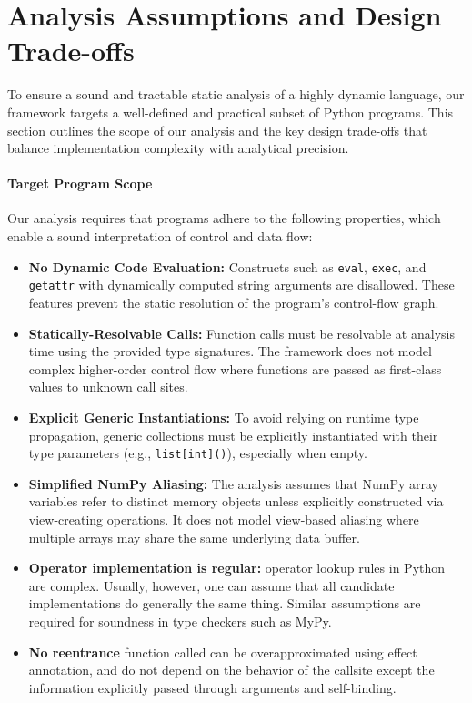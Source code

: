 \appendix
\section{Analysis Assumptions and Design Trade-offs}
\label{sec:appendix-assumptions}

To ensure a sound and tractable static analysis of a highly dynamic language, our framework targets a well-defined and practical subset of Python programs. This section outlines the scope of our analysis and the key design trade-offs that balance implementation complexity with analytical precision.

\paragraph{Target Program Scope}
Our analysis requires that programs adhere to the following properties, which enable a sound interpretation of control and data flow:
\begin{itemize}
    \item \textbf{No Dynamic Code Evaluation:} Constructs such as \texttt{eval}, \texttt{exec}, and \texttt{getattr} with dynamically computed string arguments are disallowed. These features prevent the static resolution of the program's control-flow graph.
    \item \textbf{Statically-Resolvable Calls:} Function calls must be resolvable at analysis time using the provided type signatures. The framework does not model complex higher-order control flow where functions are passed as first-class values to unknown call sites.
    \item \textbf{Explicit Generic Instantiations:} To avoid relying on runtime type propagation, generic collections must be explicitly instantiated with their type parameters (e.g., \texttt{list[int]()}), especially when empty.
    \item \textbf{Simplified NumPy Aliasing:} The analysis assumes that NumPy array variables refer to distinct memory objects unless explicitly constructed via view-creating operations. It does not model view-based aliasing where multiple arrays may share the same underlying data buffer.
    \item \textbf{Operator implementation is regular:} operator lookup rules in Python are complex. Usually, however, one can assume that all candidate implementations do generally the same thing. Similar assumptions are required for soundness in type checkers such as MyPy.
    \item \textbf{No reentrance} function called can be overapproximated using effect annotation, and do not depend on the behavior of the callsite except the information explicitly passed through arguments and self-binding.
\end{itemize}

